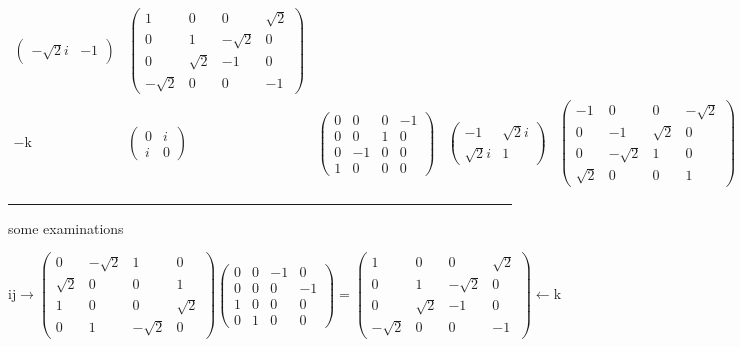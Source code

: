 \documentclass[
]{book}
\theoremstyle{definition}
\theoremstyle{definition}
\theoremstyle{definition}
\theoremstyle{definition}
\theoremstyle{remark}
\begin{document}
\[\begin{array}{ccccc}
\begin{pmatrix}
-\sqrt{2}i & -1
\end{pmatrix} & \begin{pmatrix}1 & 0 & 0 & \sqrt{2}\\
0 & 1 & -\sqrt{2} & 0\\
0 & \sqrt{2} & -1 & 0\\
-\sqrt{2} & 0 & 0 & -1
\end{pmatrix}\\
-\mathrm{k} & \begin{pmatrix}0 & i\\
i & 0
\end{pmatrix} & \begin{pmatrix}0 & 0 & 0 & -1\\
0 & 0 & 1 & 0\\
0 & -1 & 0 & 0\\
1 & 0 & 0 & 0
\end{pmatrix} & \begin{pmatrix}-1 & \sqrt{2}i\\
\sqrt{2}i & 1
\end{pmatrix} & \begin{pmatrix}-1 & 0 & 0 & -\sqrt{2}\\
0 & -1 & \sqrt{2} & 0\\
0 & -\sqrt{2} & 1 & 0\\
\sqrt{2} & 0 & 0 & 1
\end{pmatrix}
\end{array}
\]

\begin{center}\rule{0.5\linewidth}{0.5pt}\end{center}

some examinations

\[
\mathrm{i}\mathrm{j}\rightarrow\begin{pmatrix}0 & -\sqrt{2} & 1 & 0\\
\sqrt{2} & 0 & 0 & 1\\
1 & 0 & 0 & \sqrt{2}\\
0 & 1 & -\sqrt{2} & 0
\end{pmatrix}\begin{pmatrix}0 & 0 & -1 & 0\\
0 & 0 & 0 & -1\\
1 & 0 & 0 & 0\\
0 & 1 & 0 & 0
\end{pmatrix}=\begin{pmatrix}1 & 0 & 0 & \sqrt{2}\\
0 & 1 & -\sqrt{2} & 0\\
0 & \sqrt{2} & -1 & 0\\
-\sqrt{2} & 0 & 0 & -1
\end{pmatrix}\leftarrow\mathrm{k}
\]
\end{document}

